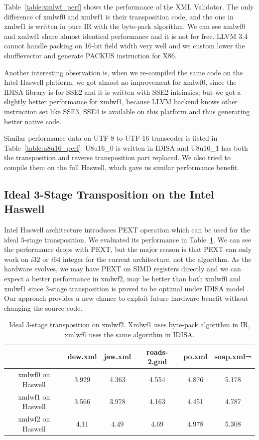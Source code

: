 Table~\ref{table:xmlwf_perf} shows the performance of the XML Validator. The only difference of xmlwf0 and xmlwf1 is their transposition code, and the one in xmlwf1 is written in pure IR with the byte-pack algorithm. We can see xmlwf0 and xmlwf1 share almost identical performance and it is not for free. LLVM 3.4 cannot handle packing on 16-bit field width very well and we custom lower the shufflevector and generate PACKUS instruction for X86.

Another interesting observation is, when we re-compiled the same code on the Intel Haswell platform, we got almost no improvement for xmlwf0, since the IDISA library is for SSE2 and it is written with SSE2 intrinsics; but we got a slightly better performance for xmlwf1, because LLVM backend knows other instruction set like SSE3, SSE4 is available on this platform and thus generating better native code.

Similar performance data on UTF-8 to UTF-16 transcoder is listed in Table~\ref{table:u8u16_perf}. U8u16\_0 is written in IDISA and U8u16\_1 has both the transposition and reverse transposition part replaced. We also tried to compile them on the full Haswell, which gave us similar performance benefit.

\subsection{Ideal 3-Stage Transposition on the Intel Haswell}
Intel Haswell architecture introduces PEXT operation which can be used for the ideal 3-stage transposition. We evaluated its performance in Table~\ref{table:PEXT_transposition}. We can see the performance drops with PEXT, but the major reason is that PEXT can only work on $i32$ or $i64$ integer for the current architecture, not the algorithm. As the hardware evolves, we may have PEXT on SIMD registers directly and we can expect a better performance in xmlwf2, may be better than both xmlwf0 and xmlwf1 since 3-stage transposition is proved to be optimal under IDISA model \cite{inductive_doubling_principle}. Our approach provides a new chance to exploit future hardware benefit without changing the source code.

\begin{table}[h]
\centering
\begin{tabular}{|c|c|c|c|c|c|}
\hline
        & dew.xml  &  jaw.xml  &  roads-2.gml  &  po.xml  & soap.xml¬ \\\hline
xmlwf0 on Haswell   &  3.929   &   4.363   &   4.554   &   4.876   &   5.178 \\ \hline
xmlwf1 on Haswell &   3.566   &   3.978   &   4.163   &   4.451   &   4.787 \\ \hline
xmlwf2 on Haswell & 4.11   &    4.49   &    4.69   &    4.978   &   5.308 \\ \hline
\end{tabular}
\caption[Ideal 3-Stage Transposition with PEXT]{Ideal 3-stage transposition on xmlwf2. Xmlwf1 uses byte-pack algorithm in IR, xmlwf0 uses the same algorithm in IDISA.}
\label{table:PEXT_transposition}
\end{table}


